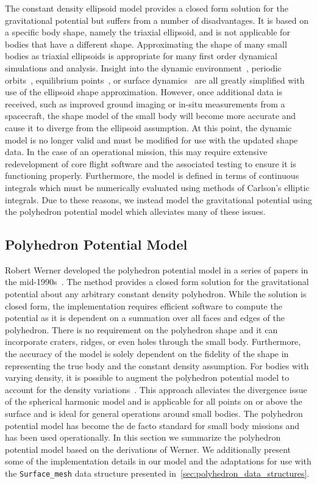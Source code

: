 The constant density ellipsoid model provides a closed form solution for the gravitational potential but suffers from a number of disadvantages.
It is based on a specific body shape, namely the triaxial ellipsoid, and is not applicable for bodies that have a different shape.
Approximating the shape of many small bodies as triaxial ellipsoids is appropriate for many first order dynamical simulations and analysis.
Insight into the dynamic environment~\cite{guelman2014}, periodic orbits~\cite{hu2002}, equilibrium points~\cite{scheeres1994}, or surface dynamics~\cite{furfaro2013} are all greatly simplified with use of the ellipsoid shape approximation.
However, once additional data is received, such as improved ground imaging or in-situ measurements from a spacecraft, the shape model of the small body will become more accurate and cause it to diverge from the ellipsoid assumption.
At this point, the dynamic model is no longer valid and must be modified for use with the updated shape data.
In the case of an operational mission, this may require extensive redevelopment of core flight software and the associated testing to ensure it is functioning properly. 
Furthermore, the model is defined in terms of continuous integrals which must be numerically evaluated using methods of Carlson's elliptic integrals.
Due to these reasons, we instead model the gravitational potential using the polyhedron potential model which alleviates many of these issues.

\subsection{Polyhedron Potential Model}\label{sec:polyhedron_potential}

Robert Werner developed the polyhedron potential model in a series of papers in the mid-1990s~\cite{werner1994,werner1996,werner1997}.
The method provides a closed form solution for the gravitational potential about any arbitrary constant density polyhedron.
While the solution is closed form, the implementation requires efficient software to compute the potential as it is dependent on a summation over all faces and edges of the polyhedron.
There is no requirement on the polyhedron shape and it can incorporate craters, ridges, or even holes through the small body.
Furthermore, the accuracy of the model is solely dependent on the fidelity of the shape in representing the true body and the constant density assumption.
For bodies with varying density, it is possible to augment the polyhedron potential model to account for the density variations~\cite{scheeres2000a}.
This approach alleviates the divergence issue of the spherical harmonic model and is applicable for all points on or above the surface and is ideal for general operations around small bodies.
The polyhedron potential model has become the de facto standard for small body missions and has been used operationally.
In this section we summarize the polyhedron potential model based on the derivations of Werner.
We additionally present some of the implementation details in our model and the adaptations for use with the \texttt{Surface\_mesh} data structure presented  in~\cref{sec:polyhedron_data_structures}.

